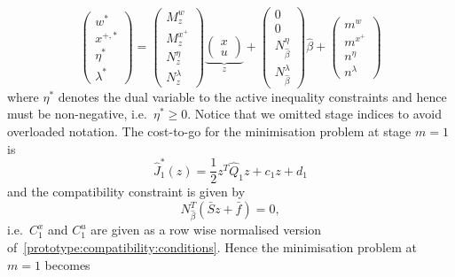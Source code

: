 \documentclass{ifacconf}
\begin{document}
\begin{equation}
      \left(\begin{array}{c}
      w^\ast \\
      x^{+,\ast} \\
      \eta^\ast \\
      \lambda^\ast
      \end{array}\right) = \left(\begin{array}{c}M^w_z\\ M^{x^+}_z \\ N^{\eta}_z \\ N^{\lambda}_z
      \end{array}\right)\underbrace{\left(\begin{array}{c}x\\ u\end{array}\right)}_z + 
      \left(\begin{array}{c}0\\ 0 \\ N^{\eta}_{\hat\beta} \\ N^{\lambda}_{\hat\beta}
      \end{array}\right)\hat\beta + \left(\begin{array}{c}m^w\\ m^{x^+} \\ n^{\eta} \\ n^{\lambda}
      \end{array}\right)
\end{equation}
where $\eta^\ast$ denotes the dual variable to the active inequality constraints and hence must
be non-negative, i.e.~$\eta^\ast\geq0$. Notice that we omitted stage indices to avoid overloaded notation.
The cost-to-go for the minimisation problem at stage $m=1$ is
\begin{equation}
	\hat J_1^\ast(z) = \frac{1}{2}z^T
    \hat Q_1 z + c_1 z + d_1
\end{equation}
and the compatibility constraint is given by
\begin{equation}\label{prototype:compatibility:conditions}
	N_{\hat\beta}^T(\bar S z + \bar f) = 0,
\end{equation}
i.e.\ $C_1^x$ and $C_1^u$ are given as a row wise normalised version of~\eqref{prototype:compatibility:conditions}.
Hence the minimisation problem at $m=1$ becomes
\end{document}

